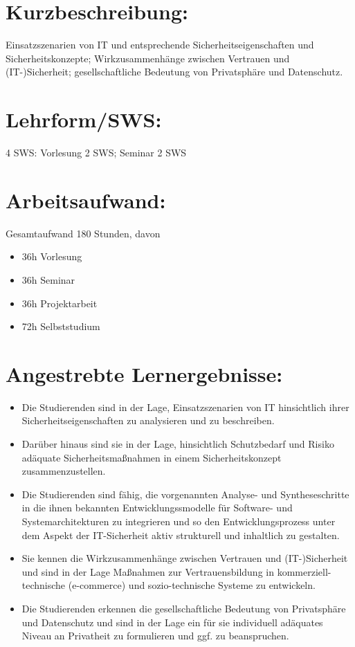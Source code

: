 \section*{Kurzbeschreibung:}\label{kurzbeschreibung-11}

Einsatzszenarien von IT und entsprechende Sicherheitseigenschaften und
Sicherheitskonzepte; Wirkzusammenhänge zwischen Vertrauen und
(IT-)Sicherheit; gesellschaftliche Bedeutung von Privatsphäre und
Datenschutz.

\section*{Lehrform/SWS:}\label{lehrformsws-19}

4 SWS: Vorlesung 2 SWS; Seminar 2 SWS

\section*{Arbeitsaufwand:}\label{arbeitsaufwand-20}

Gesamtaufwand 180 Stunden, davon

\begin{itemize}
\tightlist
\item
  36h Vorlesung
\item
  36h Seminar
\item
  36h Projektarbeit
\item
  72h Selbststudium
\end{itemize}

\section*{Angestrebte
Lernergebnisse:}\label{angestrebte-lernergebnisse-19}

\begin{itemize}
\tightlist
\item
  Die Studierenden sind in der Lage, Einsatzszenarien von IT
  hinsichtlich ihrer Sicherheitseigenschaften zu analysieren und zu
  beschreiben.
\item
  Darüber hinaus sind sie in der Lage, hinsichtlich Schutzbedarf und
  Risiko adäquate Sicherheitsmaßnahmen in einem Sicherheitskonzept
  zusammenzustellen.
\item
  Die Studierenden sind fähig, die vorgenannten Analyse- und
  Syntheseschritte in die ihnen bekannten Entwicklungssmodelle für
  Software- und Systemarchitekturen zu integrieren und so den
  Entwicklungsprozess unter dem Aspekt der IT-Sicherheit aktiv
  strukturell und inhaltlich zu gestalten.
\item
  Sie kennen die Wirkzusammenhänge zwischen Vertrauen und
  (IT-)Sicherheit und sind in der Lage Maßnahmen zur Vertrauensbildung
  in kommerziell-technische (e-commerce) und sozio-technische Systeme zu
  entwickeln.
\item
  Die Studierenden erkennen die gesellschaftliche Bedeutung von
  Privatsphäre und Datenschutz und sind in der Lage ein für sie
  individuell adäquates Niveau an Privatheit zu formulieren und ggf. zu
  beanspruchen.
\end{itemize}

